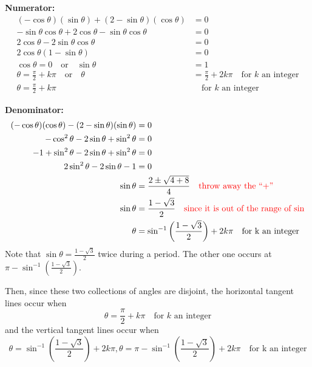 \documentclass[handout,instructornotes]{ximera}
\begin{document}
\begin{problem}
\begin{freeResponse}
	{\bf Numerator:}
		\begin{align*}
		(- \cos \theta)(\sin \theta) + (2 - \sin \theta)(\cos \theta) &= 0  \\
		- \sin \theta \cos \theta + 2 \cos \theta - \sin \theta \cos \theta &= 0  \\
		2 \cos \theta - 2 \sin \theta \cos \theta &= 0  \\
		2 \cos \theta (1 - \sin \theta) &= 0  \\
		\cos \theta = 0 \quad \text{or} \quad \sin \theta &= 1  \\
		\theta = \frac{\pi}{2} + k \pi  \quad  \text{or}  \quad  \theta &= \frac{\pi}{2} + 2k\pi \quad \text{for } k \text{ an integer}  \\
		\theta = \frac{\pi}{2} + k \pi  &\quad \text{for } k \text{ an integer}
		\end{align*}
		
	{\bf Denominator:}
		\begin{align*}
		(-\cos \theta)(\cos \theta) - (2 - \sin \theta)(\sin \theta) &= 0  \\
		- \cos^2 \theta - 2 \sin \theta + \sin^2 \theta &= 0  \\
		-1 + \sin^2 \theta - 2 \sin \theta + \sin^2 \theta &= 0  \\
		2 \sin^2 \theta - 2 \sin \theta - 1 &= 0  \\
		\sin \theta &= \frac{2 \pm \sqrt{4 + 8}}{4}  	\quad  {\color{red}\text{throw away the ``+'' }}\\
		\sin \theta &= \frac{1 - \sqrt{3}}{2}  \quad {\color{red}\text{since it is out of the range of sin}}\\
		\theta &= \sin^{-1} \left( \frac{1-\sqrt{3}}{2} \right) + 2 k \pi 	\quad \text{for k an integer}
		\end{align*}
	Note that $\sin \theta = \frac{1-\sqrt{3}}{2}$ twice during a period. The other one occurs at $\pi - \sin^{-1}\left(\frac{1-\sqrt{3}}{2}\right)$. 
		
	Then, since these two collections of angles are disjoint, the horizontal tangent lines occur when
		\[
		\boxed{\theta = \frac{\pi}{2} + k \pi}  \quad \text{for } k \text{ an integer}
		\]
	and the vertical tangent lines occur when
		\[
		\boxed{\theta = \sin^{-1} \left( \frac{1-\sqrt{3}}{2} \right) + 2 k \pi, \theta = \pi - \sin^{-1}\left(\frac{1-\sqrt{3}}{2}\right)+2k \pi} 	\quad \text{for k an integer}
		\]
	\end{freeResponse}
	
\end{problem}
\end{document}
